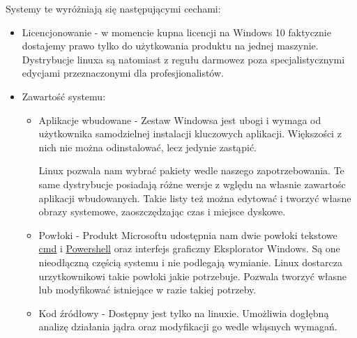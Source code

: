 \documentclass[10pt,a4paper]{report}
\begin{document}
Systemy te wyróżniają się następującymi cechami:
\begin{itemize}
\item Licencjonowanie - 
w momencie kupna licencji na Windows 10 faktycznie dostajemy prawo tylko do użytkowania produktu na jednej maszynie. Dystrybucje linuxa są natomiast z regułu darmowez poza specjalistycznymi edycjami przeznaczonymi dla profesjionalistów.
\item Zawartość systemu:
\begin{itemize}
\item Aplikacje wbudowane - Zestaw Windowsa jest ubogi i wymaga od użytkownika samodzielnej instalacji kluczowych aplikacji. Większości z nich nie można odinstalować, lecz jedynie zastąpić. 

Linux pozwala nam wybrać pakiety wedle naszego zapotrzebowania. Te same dystrybucje posiadają różne wersje z wględu na własnie zawartośc aplikacji wbudowanych. Takie listy też można edytować i tworzyć własne obrazy systemowe, zaoszczędzając czas i miejsce dyskowe.

\item Powłoki - Produkt Microsoftu udostępnia nam dwie powłoki tekstowe \underline{cmd} i \underline{Powershell} oraz interfejs graficzny Eksplorator Windows. Są one nieodłączną częścią systemu i nie podlegają wymianie. Linux dostarcza urzytkownikowi takie powłoki jakie potrzebuje. Pozwala tworzyć własne lub modyfikować istniejące w razie takiej potrzeby.

\item Kod źródłowy - Dostępny jest tylko na linuxie. Umożliwia dogłębną analizę działania jądra oraz modyfikacji go wedle włąsnych wymagań.


\end{itemize}
\end{itemize}
\end{document}

